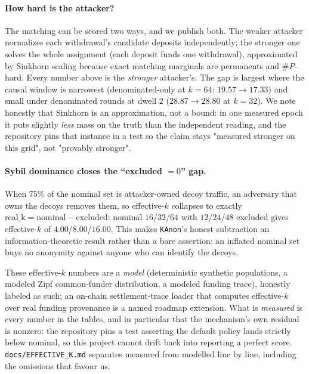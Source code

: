 \documentclass[10pt]{article}
\newcommand{\code}[1]{\texttt{#1}}
\begin{document}
\paragraph{How hard is the attacker?} The matching can be scored two ways, and we
publish both. The weaker attacker normalizes each withdrawal's candidate deposits
independently; the stronger one solves the whole assignment (each deposit funds one
withdrawal), approximated by Sinkhorn scaling because exact matching marginals are
permanents and $\#P$-hard. Every number above is the \emph{stronger} attacker's.
The gap is largest where the causal window is narrowest (denominated-only at
$k{=}64$: $19.57 \to 17.33$) and small under denominated rounds at dwell $2$
($28.87 \to 28.80$ at $k{=}32$). We note honestly that Sinkhorn is an
approximation, not a bound: in one measured epoch it puts slightly \emph{less} mass
on the truth than the independent reading, and the repository pins that instance in
a test so the claim stays "measured stronger on this grid", not "provably stronger".

\paragraph{Sybil dominance closes the ``excluded $=0$'' gap.} When $75\%$ of the
nominal set is attacker-owned decoy traffic, an adversary that owns the decoys
removes them, so effective-$k$ collapses to exactly $\text{real\_k} =
\text{nominal} - \text{excluded}$: nominal $16$/$32$/$64$ with $12$/$24$/$48$
excluded gives effective-$k$ of $4.00$/$8.00$/$16.00$. This makes \code{KAnon}'s
honest subtraction an information-theoretic result rather than a bare assertion:
an inflated nominal set buys no anonymity against anyone who can identify the
decoys.

These effective-$k$ numbers are a \emph{model} (deterministic synthetic
populations, a modeled Zipf common-funder distribution, a modeled funding trace),
honestly labeled as such; an on-chain settlement-trace loader that computes
effective-$k$ over real funding provenance is a named roadmap extension. What is
\emph{measured} is every number in the tables, and in particular that the
mechanism's own residual is nonzero: the repository pins a test asserting the
default policy lands strictly below nominal, so this project cannot drift back
into reporting a perfect score. \code{docs/EFFECTIVE\_K.md} separates measured
from modelled line by line, including the omissions that favour us.
\end{document}
